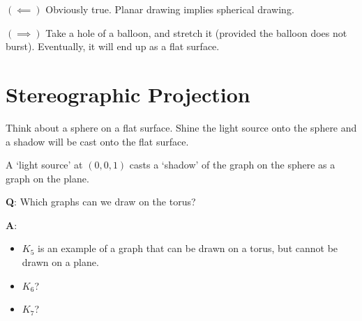 $ (\impliedby) $ Obviously true. Planar drawing implies spherical drawing.

$ (\implies) $ Take a hole of a balloon, and stretch it (provided the balloon
does not burst). Eventually, it will end up as a flat surface.

\section{Stereographic Projection}
Think about a sphere on a flat surface. Shine the light source onto the sphere
and a shadow will be cast onto the flat surface.

A `light source' at $ (0,0,1) $ casts a `shadow' of the graph on the sphere as
a graph on the plane.

\textbf{Q}: Which graphs can we draw on the torus?

\textbf{A}:
\begin{itemize}
    \item $ K_5 $ is an example of a graph that can be drawn on
          a torus, but cannot be drawn on a plane.
    \item $ K_6 $?
    \item $ K_7 $?
\end{itemize}
